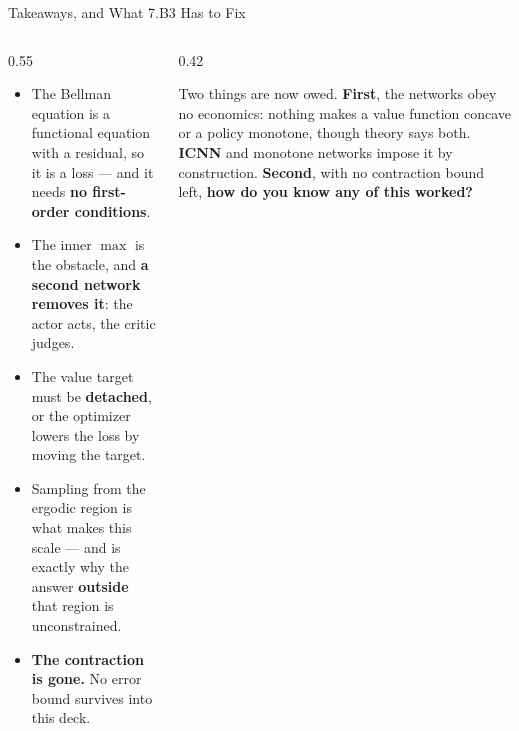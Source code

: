 \begin{frame}{Takeaways, and What 7.B3 Has to Fix}
\begin{columns}[T]
\begin{column}{0.55\textwidth}
\begin{takeawaybox}\small
\begin{itemize}\small\setlength{\itemsep}{1.1mm}
  \item The Bellman equation is a functional equation with a residual, so it is a loss --- and it needs \textbf{no first-order conditions}.
  \item The inner $\max$ is the obstacle, and \textbf{a second network removes it}: the actor acts, the critic judges.
  \item The value target must be \textbf{detached}, or the optimizer lowers the loss by moving the target.
  \item Sampling from the ergodic region is what makes this scale --- and is exactly why the answer \textbf{outside} that region is unconstrained.
  \item \textbf{The contraction is gone.} No error bound survives into this deck.
\end{itemize}
\end{takeawaybox}
\end{column}
\begin{column}{0.42\textwidth}
\begin{conceptbox}[title=\textbf{Bridge to 7.B3}]\small
Two things are now owed.
\medskip
\textbf{First}, the networks obey no economics: nothing makes a value function concave or a policy monotone, though theory says both. \textbf{ICNN} and monotone networks impose it by construction.
\medskip
\textbf{Second}, with no contraction bound left, \textbf{how do you know any of this worked?}
\end{conceptbox}
\end{column}
\end{columns}
\end{frame}


